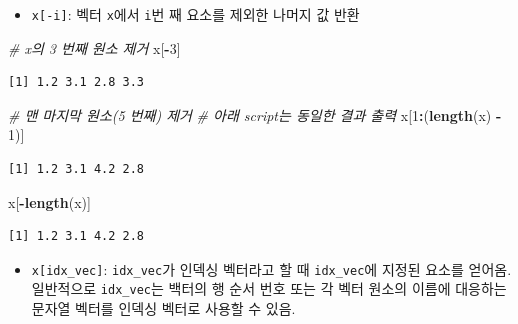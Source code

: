 \documentclass[
  11pt,
]{krantz}
\newenvironment{Shaded}{\begin{snugshade}}{\end{snugshade}}
\newcommand{\CommentTok}[1]{\textcolor[rgb]{0.37,0.37,0.37}{\textit{#1}}}
\newcommand{\DecValTok}[1]{\textcolor[rgb]{0.06,0.06,0.06}{#1}}
\newcommand{\KeywordTok}[1]{\textcolor[rgb]{0.27,0.27,0.27}{\textbf{#1}}}
\newcommand{\NormalTok}[1]{#1}
\newcommand{\OperatorTok}[1]{\textcolor[rgb]{0.43,0.43,0.43}{\textbf{#1}}}
\newcommand{\StringTok}[1]{\textcolor[rgb]{0.5,0.5,0.5}{#1}}
\providecommand{\tightlist}{%
  \setlength{\itemsep}{0pt}\setlength{\parskip}{0pt}}
\begin{document}
\normalsize

\begin{itemize}
\tightlist
\item
  \texttt{x{[}-i{]}}: 벡터 \texttt{x}에서 \texttt{i}번 째 요소를 제외한 나머지 값 반환
\end{itemize}

\footnotesize

\begin{Shaded}
\begin{Highlighting}[]
\CommentTok{# x의 3 번째 원소 제거}
\NormalTok{x[}\OperatorTok{-}\DecValTok{3}\NormalTok{]}
\end{Highlighting}
\end{Shaded}

\begin{verbatim}
[1] 1.2 3.1 2.8 3.3
\end{verbatim}

\begin{Shaded}
\begin{Highlighting}[]
\CommentTok{# 맨 마지막 원소(5 번째) 제거}
\CommentTok{# 아래 script는 동일한 결과 출력}
\NormalTok{x[}\DecValTok{1}\OperatorTok{:}\NormalTok{(}\KeywordTok{length}\NormalTok{(x) }\OperatorTok{-}\StringTok{ }\DecValTok{1}\NormalTok{)]}
\end{Highlighting}
\end{Shaded}

\begin{verbatim}
[1] 1.2 3.1 4.2 2.8
\end{verbatim}

\begin{Shaded}
\begin{Highlighting}[]
\NormalTok{x[}\OperatorTok{-}\KeywordTok{length}\NormalTok{(x)]}
\end{Highlighting}
\end{Shaded}

\begin{verbatim}
[1] 1.2 3.1 4.2 2.8
\end{verbatim}

\normalsize

\begin{itemize}
\tightlist
\item
  \texttt{x{[}idx\_vec{]}}: \texttt{idx\_vec}가 인덱싱 벡터라고 할 때 \texttt{idx\_vec}에 지정된 요소를 얻어옴. 일반적으로 \texttt{idx\_vec}는 백터의 행 순서 번호 또는 각 벡터 원소의 이름에 대응하는 문자열 벡터를 인덱싱 벡터로 사용할 수 있음.
\end{itemize}
\end{document}
